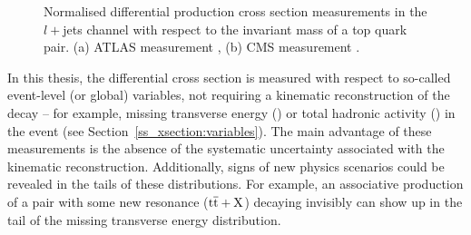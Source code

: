 \begin{figure}[hbtp]
   \centering
   \caption[Normalised differential \ttbar production cross section measurements by ATLAS and CMS
   collaborations]{Normalised differential \ttbar production cross section measurements in the $l+$jets channel with
   respect to the invariant mass of a top quark pair. (a) ATLAS measurement \autocite{ATLAS_diff_xsections_7TeV}, (b)
   CMS measurement \autocite{CMS_diff_xsections_7TeV}.}
   \label{fig:ATLAS_CMS_diff_xsections}
\end{figure}

In this thesis, the \ttbar differential cross section is measured with respect to so-called event-level (or global)
variables, not requiring a kinematic reconstruction of the \ttbar decay -- for example, missing transverse energy (\MET)
or total hadronic activity (\HT) in the event (see Section~\ref{ss_xsection:variables}). The main advantage of these
measurements is the absence of the systematic uncertainty associated with the kinematic reconstruction. Additionally,
signs of new physics scenarios could be revealed in the tails of these distributions. For example, an associative
production of a \ttbar pair with some new resonance ($\mathrm{t}\overline{\mathrm{t}}+\mathrm{X}$) decaying invisibly can show up in the tail of
the missing transverse energy distribution.


